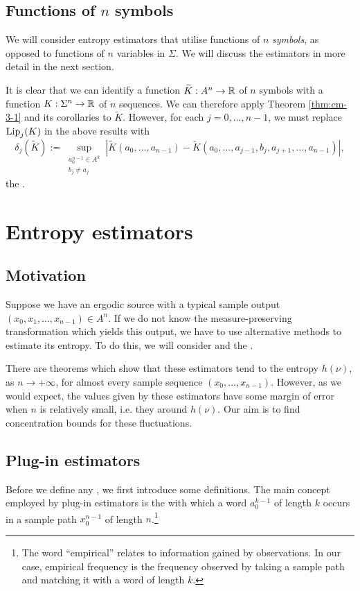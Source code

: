 \subsection{Functions of \texorpdfstring{$n$}{n} symbols}
We will consider entropy estimators that utilise functions of $n$ \emph{symbols}, as opposed to functions of $n$ variables in $\Sigma$. We will discuss the estimators in more detail in the next section.

It is clear that we can identify a function $\widetilde{K} : A^n \to \mathbb{R}$ of $n$ symbols with a function $K : \Sigma^n \to \mathbb{R}$ of $n$ sequences. We can therefore apply Theorem \ref{thm:cm-3-1} and its corollaries to $\tilde{K}$. However, for each $j = 0, \dots, n - 1$, we must replace $\operatorname{Lip}_j(K)$ in the above results with
\[
	\delta_j(\tilde{K}) := \sup_{\substack{a_0^{n - 1} \in A^k \\ b_j \neq a_j}}{|\tilde{K}(a_0, \dots, a_{n - 1}) - \tilde{K}(a_0, \dots, a_{j - 1}, b_j, a_{j + 1}, \dots, a_{n - 1})|},
\]
the .

\section{Entropy estimators}\label{sec:estimator-bounds}
\subsection{Motivation}
Suppose we have an ergodic source with a typical sample output $(x_0, x_1, \dots, x_{n - 1}) \in A^n$. If we do not know the measure-preserving transformation which yields this output, we have to use alternative methods to estimate its entropy. To do this, we will consider  and the .

There are theorems which show that these estimators tend to the entropy $h(\nu)$, as $n \to +\infty$, for almost every sample sequence $(x_0, \dots, x_{n - 1})$. However, as we would expect, the values given by these estimators have some margin of error when $n$ is relatively small, i.e. they  around $h(\nu)$. Our aim is to find concentration bounds for these fluctuations.

\subsection{Plug-in estimators}
Before we define any , we first introduce some definitions. The main concept employed by plug-in estimators is the  with which a word $a_0^{k - 1}$ of length $k$ occurs in a sample path $x_0^{n - 1}$ of length $n$.\footnote{The word ``empirical'' relates to information gained by observations. In our case, empirical frequency is the frequency observed by taking a sample path and matching it with a word of length $k$.}


